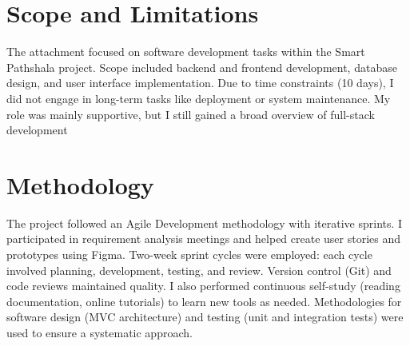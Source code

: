 \documentclass[12pt,a4paper]{report}
\let\oldcite\cite
\renewcommand{\cite}[1]{\textcolor{impactcolor}{\oldcite{#1}}}
\begin{document}
\section{Scope and Limitations}
The attachment focused on software development tasks within the Smart Pathshala project. Scope included backend and frontend development, database design, and user interface implementation. Due to time constraints (10 days), I did not engage in
long-term tasks like deployment or system maintenance. My role was mainly supportive,
but I still gained a broad overview of full-stack development

\section{Methodology}
The project followed an Agile \cite{ref8} Development methodology with iterative sprints. I participated in requirement analysis meetings and helped create user stories and prototypes using Figma. Two-week sprint cycles were employed: each cycle involved planning, development, testing, and review. Version control (Git) and code reviews maintained quality. I also performed continuous self-study (reading documentation, online tutorials) to learn new tools as needed. Methodologies for software design (MVC architecture) and testing (unit and integration tests) were used to ensure a systematic approach.
\end{document}
